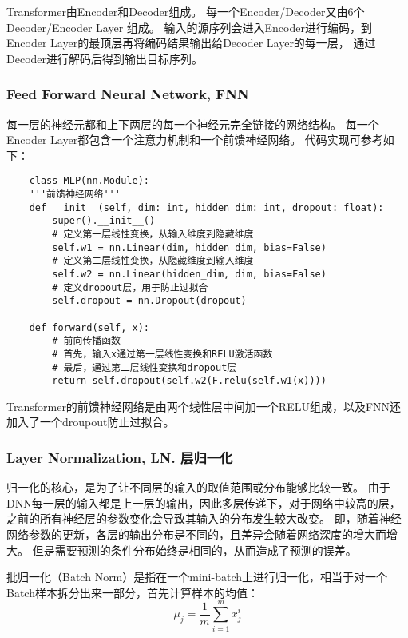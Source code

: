 \documentclass{article}
\begin{document}
Transformer由Encoder和Decoder组成。
每一个Encoder/Decoder又由6个Decoder/Encoder Layer 组成。
输入的源序列会进入Encoder进行编码，到Encoder Layer的最顶层再将编码结果输出给Decoder Layer的每一层，
通过Decoder进行解码后得到输出目标序列。

\subsubsection{Feed Forward Neural Network, FNN}
每一层的神经元都和上下两层的每一个神经元完全链接的网络结构。
每一个Encoder Layer都包含一个注意力机制和一个前馈神经网络。
代码实现可参考如下：

\begin{verbatim}
    class MLP(nn.Module):
    '''前馈神经网络'''
    def __init__(self, dim: int, hidden_dim: int, dropout: float):
        super().__init__()
        # 定义第一层线性变换，从输入维度到隐藏维度
        self.w1 = nn.Linear(dim, hidden_dim, bias=False)
        # 定义第二层线性变换，从隐藏维度到输入维度
        self.w2 = nn.Linear(hidden_dim, dim, bias=False)
        # 定义dropout层，用于防止过拟合
        self.dropout = nn.Dropout(dropout)

    def forward(self, x):
        # 前向传播函数
        # 首先，输入x通过第一层线性变换和RELU激活函数
        # 最后，通过第二层线性变换和dropout层
        return self.dropout(self.w2(F.relu(self.w1(x))))
\end{verbatim}

Transformer的前馈神经网络是由两个线性层中间加一个RELU组成，以及FNN还加入了一个droupout防止过拟合。

\subsubsection{Layer Normalization, LN. 层归一化}

归一化的核心，是为了让不同层的输入的取值范围或分布能够比较一致。
由于DNN每一层的输入都是上一层的输出，因此多层传递下，对于网络中较高的层，之前的所有神经层的参数变化会导致其输入的分布发生较大改变。
即，随着神经网络参数的更新，各层的输出分布是不同的，且差异会随着网络深度的增大而增大。
但是需要预测的条件分布始终是相同的，从而造成了预测的误差。

批归一化（Batch Norm）是指在一个mini-batch上进行归一化，相当于对一个Batch样本拆分出来一部分，首先计算样本的均值：
\begin{equation}
    \mu_j = \frac{1}{m} \sum_{i=1}^{m} x^{i}_{j}
    \label{eq:batchnorm1}
\end{equation}
\end{document}
